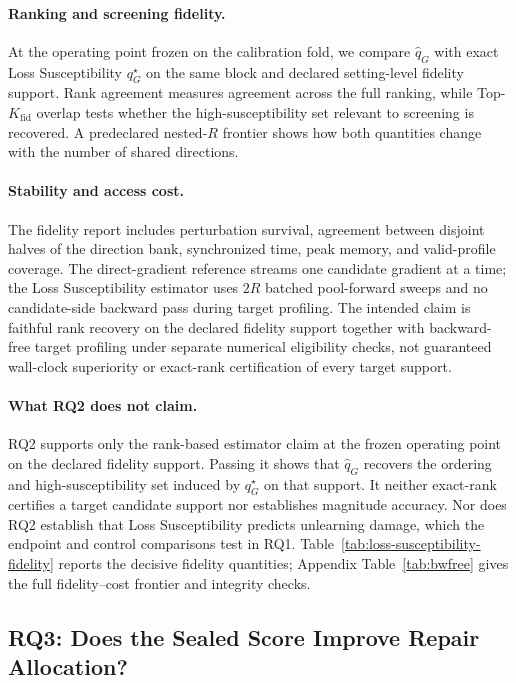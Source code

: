 \paragraph{Ranking and screening fidelity.}
At the operating point frozen on the calibration fold, we compare
$\widehat q_G$ with exact Loss Susceptibility $q_G^\star$ on the
same block and declared setting-level fidelity support. Rank agreement measures
agreement across the full ranking, while Top-$K_{\mathrm{fid}}$ overlap tests whether the
high-susceptibility set relevant to screening is recovered. A predeclared
nested-$R$ frontier
shows how both quantities change with the number of shared directions.

\paragraph{Stability and access cost.}
The fidelity report includes perturbation survival, agreement between
disjoint halves of the direction bank, synchronized time, peak memory, and
valid-profile coverage. The direct-gradient reference streams one candidate
gradient at a time; the Loss Susceptibility estimator uses $2R$
batched pool-forward sweeps and no
candidate-side backward pass during target profiling. The intended claim is
faithful rank recovery on the declared fidelity support together with
backward-free target profiling under separate numerical eligibility checks,
not guaranteed wall-clock superiority or exact-rank certification of every
target support.

\paragraph{What RQ2 does not claim.}
RQ2 supports only the rank-based estimator claim at the frozen operating point
on the declared fidelity support. Passing it shows that $\widehat q_G$
recovers the ordering and high-susceptibility set induced by $q_G^\star$ on
that support. It neither exact-rank certifies a target candidate support nor
establishes magnitude accuracy. Nor does RQ2 establish that Loss Susceptibility
predicts unlearning damage, which the endpoint and control
comparisons test in RQ1.
Table~\ref{tab:loss-susceptibility-fidelity} reports the decisive fidelity quantities;
Appendix Table~\ref{tab:bwfree} gives the full fidelity--cost frontier and
integrity checks.

\subsection{RQ3: Does the Sealed Score Improve Repair Allocation?}
\label{sec:exp-protection}
\label{sec:exp-alpha}

